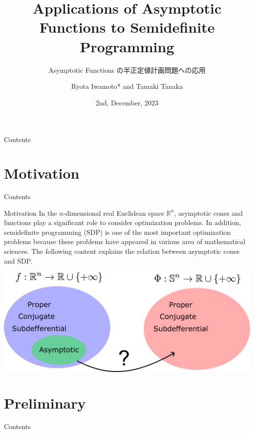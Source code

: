 \documentclass[aspectratio=169, dvipdfmx, 11pt]{beamer} %
\title[Asymptotic Functions の半正定値計画問題への応用]{Applications of Asymptotic Functions to Semidefinite Programming}
\subtitle{Asymptotic Functions の半正定値計画問題への応用}
\author[Ryota Iwamoto]{Ryota Iwamoto* and Tamaki Tanaka}
\institute[Niigata Univ]{Niigata Univ}
\date{2nd, December, 2023}
\newcommand{\NDemenstionalRealEuclideanSpace}{\mathbb{R}^n}
\begin{document}
\maketitle

\begin{frame}{Contents}
  \tableofcontents
\end{frame}

\section{Motivation}
\begin{frame}{Contents}
  \tableofcontents[currentsection]
\end{frame}

\begin{frame}{Motivation}
In the $n$-dimensional real Euclidean space $\NDemenstionalRealEuclideanSpace$, asymptotic cones and functions play a significant role to consider optimization problems. In addition, semidefinite programming (SDP) is one of the most important optimization problems because these problems have appeared in various area of mathematical sciences. The following content explains the relation between asymptotic cones and SDP.

\bigskip

\centering
\includegraphics[keepaspectratio, scale=0.12]{figures/summary_sendai_seminer_2023.eps}
\end{frame}

\section{Preliminary}
\begin{frame}{Contents}
  \tableofcontents[currentsection]
\end{frame}
\end{document}
